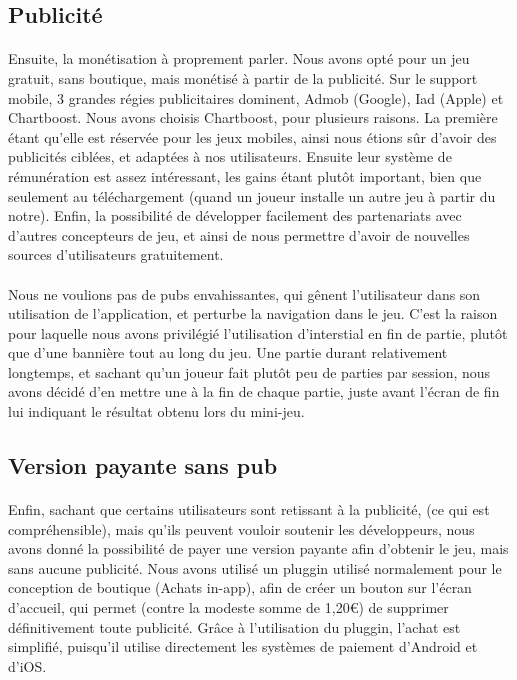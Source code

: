 \subsection{Publicité}

\paragraph{}Ensuite, la monétisation à proprement parler. Nous avons opté pour un jeu gratuit, sans boutique, mais monétisé à partir de la publicité. Sur le support mobile, 3 grandes régies publicitaires dominent, Admob (Google), Iad (Apple) et Chartboost. Nous avons choisis Chartboost, pour plusieurs raisons. La première étant qu'elle est réservée pour les jeux mobiles, ainsi nous étions sûr d'avoir des publicités ciblées, et adaptées à nos utilisateurs. Ensuite leur système de rémunération est assez intéressant, les gains étant plutôt important, bien que seulement au téléchargement (quand un joueur installe un autre jeu à partir du notre). Enfin, la possibilité de développer facilement des partenariats avec d'autres concepteurs de jeu, et ainsi de nous permettre d'avoir de nouvelles sources d'utilisateurs gratuitement. 
\paragraph{}
Nous ne voulions pas de pubs envahissantes, qui gênent l'utilisateur dans son utilisation de l'application, et perturbe la navigation dans le jeu. C'est la raison pour laquelle nous avons privilégié l'utilisation d'interstial en fin de partie, plutôt que d'une bannière tout au long du jeu. Une partie durant relativement longtemps, et sachant qu'un joueur fait plutôt peu de parties par session, nous avons décidé d'en mettre une à la fin de chaque partie, juste avant l'écran de fin lui indiquant le résultat obtenu lors du mini-jeu.

\subsection{Version payante sans pub}

\paragraph{}
Enfin, sachant que certains utilisateurs sont retissant à la publicité, (ce qui est compréhensible), mais qu'ils peuvent vouloir soutenir les développeurs, nous avons donné la possibilité de payer une version payante afin d'obtenir le jeu, mais sans aucune publicité. Nous avons utilisé un pluggin utilisé normalement pour le conception de boutique (Achats in-app), afin de créer un bouton sur l'écran d'accueil, qui permet (contre la modeste somme de 1,20\euro) de supprimer définitivement toute publicité. Grâce à l'utilisation du pluggin, l'achat est simplifié, puisqu'il utilise directement les systèmes de paiement d'Android et d'iOS.  
